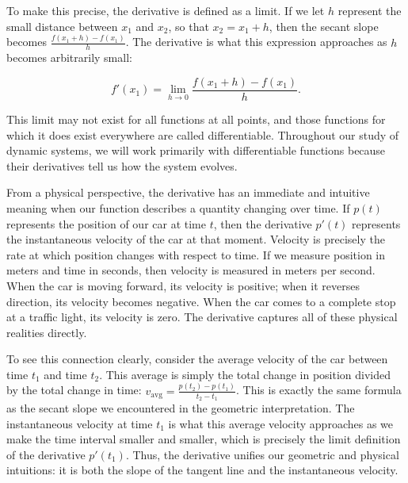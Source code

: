 To make this precise, the derivative is defined as a limit. If we let $h$ represent the small distance between $x_1$ and $x_2$, so that $x_2 = x_1 + h$, then the secant slope becomes $\frac{f(x_1 + h) - f(x_1)}{h}$. The derivative is what this expression approaches as $h$ becomes arbitrarily small:

\[
f'(x_1) = \lim_{h \to 0} \frac{f(x_1 + h) - f(x_1)}{h}.
\]

This limit may not exist for all functions at all points, and those functions for which it does exist everywhere are called differentiable. Throughout our study of dynamic systems, we will work primarily with differentiable functions because their derivatives tell us how the system evolves.

From a physical perspective, the derivative has an immediate and intuitive meaning when our function describes a quantity changing over time. If $p(t)$ represents the position of our car at time $t$, then the derivative $p'(t)$ represents the instantaneous velocity of the car at that moment. Velocity is precisely the rate at which position changes with respect to time. If we measure position in meters and time in seconds, then velocity is measured in meters per second. When the car is moving forward, its velocity is positive; when it reverses direction, its velocity becomes negative. When the car comes to a complete stop at a traffic light, its velocity is zero. The derivative captures all of these physical realities directly.

To see this connection clearly, consider the average velocity of the car between time $t_1$ and time $t_2$. This average is simply the total change in position divided by the total change in time: $v_{\text{avg}} = \frac{p(t_2) - p(t_1)}{t_2 - t_1}$. This is exactly the same formula as the secant slope we encountered in the geometric interpretation. The instantaneous velocity at time $t_1$ is what this average velocity approaches as we make the time interval smaller and smaller, which is precisely the limit definition of the derivative $p'(t_1)$. Thus, the derivative unifies our geometric and physical intuitions: it is both the slope of the tangent line and the instantaneous velocity.

